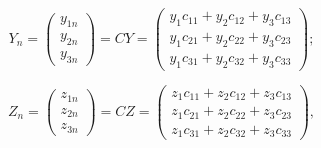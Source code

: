 \begin{equation*}

	Y_n = 

		\begin{pmatrix} 

			y_{1n} \\ 

			y_{2n} \\ 

			y_{3n} 

		\end{pmatrix} 

		= CY = 

		\begin{pmatrix} 

			y_{1}c_{11} + y_{2}c_{12} + y_{3}c_{13} \\ 

			y_{1}c_{21} + y_{2}c_{22} + y_{3}c_{23} \\ 

			y_{1}c_{31} + y_{2}c_{32} + y_{3}c_{33} 

		\end{pmatrix};

\end{equation*}



\begin{equation*}

	Z_n = 

		\begin{pmatrix} 

			z_{1n} \\ 

			z_{2n} \\ 

			z_{3n} 

		\end{pmatrix} 

		= CZ = 

		\begin{pmatrix} 

			z_{1}c_{11} + z_{2}c_{12} + z_{3}c_{13} \\ 

			z_{1}c_{21} + z_{2}c_{22} + z_{3}c_{23} \\ 

			z_{1}c_{31} + z_{2}c_{32} + z_{3}c_{33} 

		\end{pmatrix},

\end{equation*}

\\

